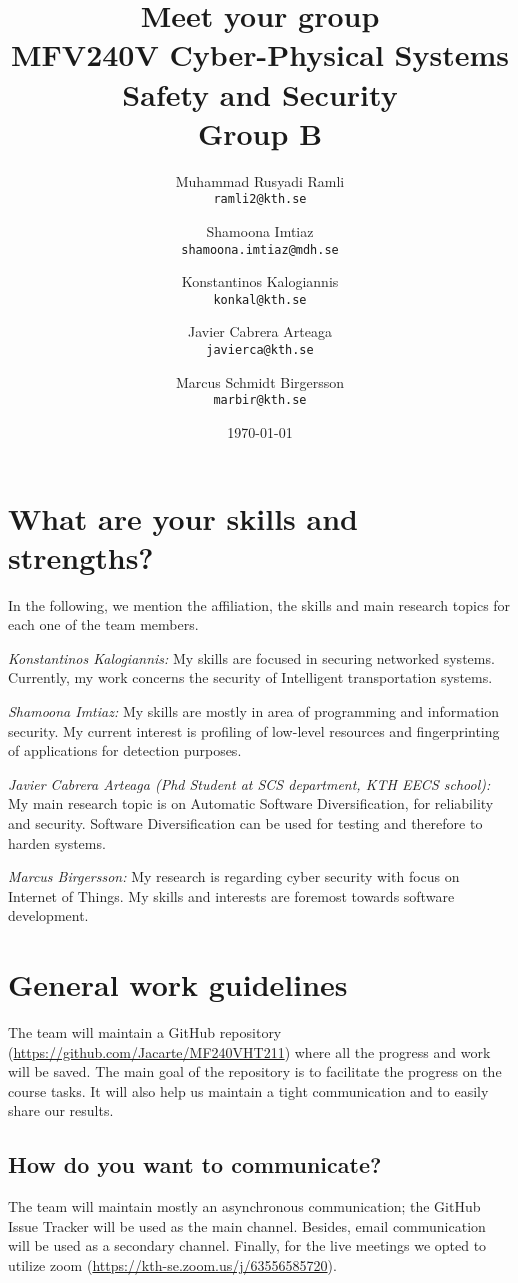 \documentclass{article}
\title{Meet your group \\ \large MFV240V Cyber-Physical Systems Safety and Security \\ Group B}
\author{
  \and
  Muhammad Rusyadi Ramli\\
  \texttt{ramli2@kth.se}
  \and
  Shamoona Imtiaz\\
  \texttt{shamoona.imtiaz@mdh.se}
  \and
  Konstantinos Kalogiannis\\
  \texttt{konkal@kth.se}
  \and
  Javier Cabrera Arteaga\\
  \texttt{javierca@kth.se}
  \and
  Marcus Schmidt Birgersson\\
  \texttt{marbir@kth.se}
}
\date{\today}
\begin{document}
\maketitle


\section{What are your skills and strengths?}

In the following, we mention the affiliation, the skills and main research topics for each one of the team members. 

\textit{Konstantinos Kalogiannis:} My skills are focused in securing networked systems. Currently, my work concerns the security of Intelligent transportation systems.

\textit {Shamoona Imtiaz:} My skills are mostly in area of programming and information security. My current interest is profiling of low-level resources and fingerprinting of applications for detection purposes.

\textit{Javier Cabrera Arteaga (Phd Student at SCS department, KTH EECS school):} My main research topic is on Automatic Software Diversification, for reliability and security. Software Diversification can be used for testing and therefore to harden systems.

\textit {Marcus Birgersson:} My research is regarding cyber security with focus on Internet of Things. My skills and interests are foremost towards software development.

\section{General work guidelines}

The team will maintain a GitHub repository (\url{https://github.com/Jacarte/MF240VHT211}) where all the progress and work will be saved. The main goal of the repository is to facilitate the progress on the course tasks. It will also help us maintain a tight communication and to easily share our results. 

\subsection{How do you want to communicate?}

The team will maintain mostly an asynchronous communication; the GitHub Issue Tracker will be used as the main channel. Besides, email communication will be used as a secondary channel. Finally, for the live meetings we opted to utilize zoom (\url{https://kth-se.zoom.us/j/63556585720}).
\end{document}
